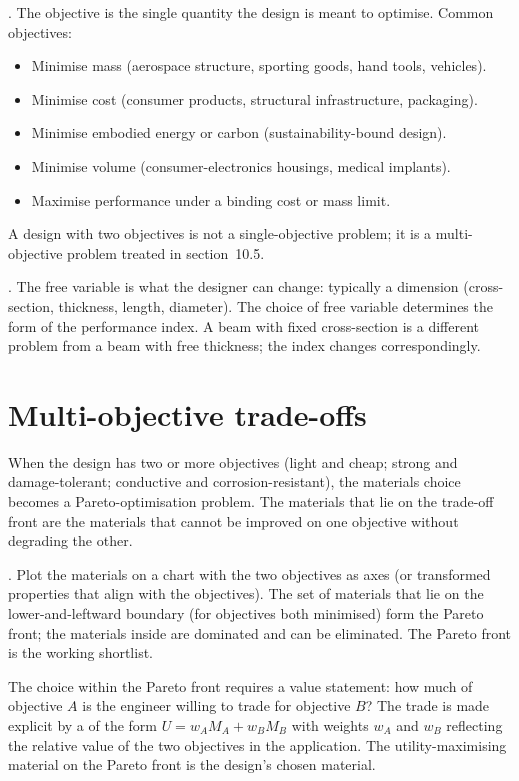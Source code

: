 . The objective is the single quantity the
design is meant to optimise. Common objectives:

\begin{itemize}[leftmargin=*]
\item Minimise mass (aerospace structure, sporting goods, hand tools,
  vehicles).
\item Minimise cost (consumer products, structural infrastructure,
  packaging).
\item Minimise embodied energy or carbon (sustainability-bound
  design).
\item Minimise volume (consumer-electronics housings, medical
  implants).
\item Maximise performance under a binding cost or mass limit.
\end{itemize}

A design with two objectives is not a single-objective problem; it is
a multi-objective problem treated in section~10.5.

. The free variable is what the designer
can change: typically a dimension (cross-section, thickness, length,
diameter). The choice of free variable determines the form of the
performance index. A beam with fixed cross-section is a different
problem from a beam with free thickness; the index changes
correspondingly.

\section{Multi-objective trade-offs}

When the design has two or more objectives (light and cheap; strong
and damage-tolerant; conductive and corrosion-resistant), the
materials choice becomes a Pareto-optimisation problem. The materials
that lie on the trade-off front are the materials that cannot be
improved on one objective without degrading the other.

. Plot the materials on a chart with
the two objectives as axes (or transformed properties that align with
the objectives). The set of materials that lie on the lower-and-leftward
boundary (for objectives both minimised) form the Pareto front; the
materials inside are dominated and can be eliminated. The Pareto
front is the working shortlist.

The choice within the Pareto front requires a value statement: how
much of objective $A$ is the engineer willing to trade for objective
$B$? The trade is made explicit by a  of
the form $U = w_A M_A + w_B M_B$ with weights $w_A$ and $w_B$
reflecting the relative value of the two objectives in the
application. The utility-maximising material on the Pareto front is
the design's chosen material.

